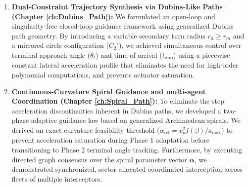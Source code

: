 \begin{enumerate}
    \item \textbf{Dual-Constraint Trajectory Synthesis via Dubins-Like Paths (Chapter \ref{ch:Dubins_Path}):} We formulated an open-loop and singularity-free closed-loop guidance framework using generalized Dubins path geometry. By introducing a variable secondary turn radius $r_d \ge r_m$ and a mirrored circle configuration ($C_2'$), we achieved simultaneous control over terminal approach angle ($\theta_t$) and time of arrival ($t_{\text{imp}}$) using a piecewise-constant lateral acceleration profile that eliminates the need for high-order polynomial computations, and prevents actuator saturation.
    
    \item \textbf{Continuous-Curvature Spiral Guidance and multi-agent Coordination (Chapter \ref{ch:Spiral_Path}):} To eliminate the step acceleration discontinuities inherent in Dubins paths, we developed a two-phase adaptive guidance law based on generalized Archimedean spirals. We derived an exact curvature feasibility threshold ($\alpha_{\text{ref}} = v_p^2 f(\beta) / a_{\max}$) to prevent acceleration saturation during Phase 1 adaptation before transitioning to Phase 2 terminal angle tracking. Furthermore, by executing directed graph consensus over the spiral parameter vector $\boldsymbol{\alpha}$, we demonstrated synchronized, sector-allocated coordinated interception across fleets of multiple interceptors.
\end{enumerate}

